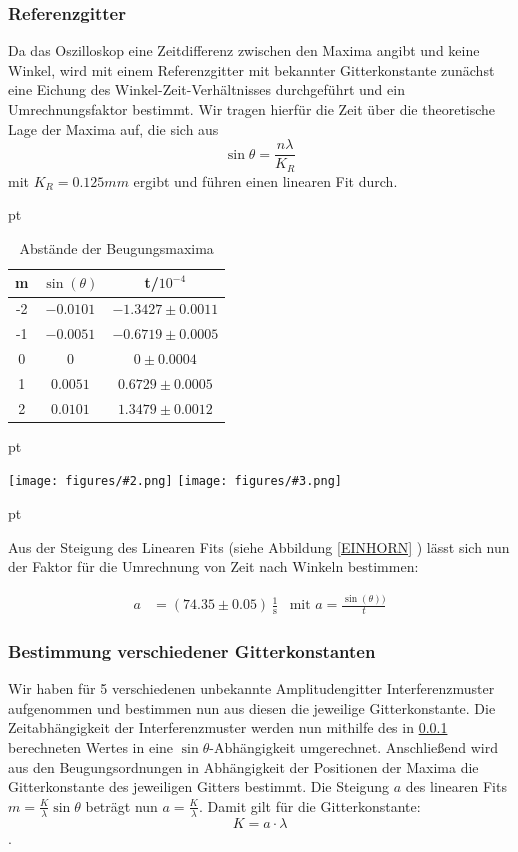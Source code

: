 \documentclass[12pt]{article}
\newcommand{\graTwo}[4][0.5]{
	\begin{minipage}[h!]{\textwidth}
		\centering
		\texttt{[image: figures/\#2.png]}
		\texttt{[image: figures/\#3.png]}
		\captionof{figure}{#4}
	\end{minipage}
	\vskip 30 pt
}
\begin{document}
\subsubsection{Referenzgitter}

\label{Happyisttoll}

Da das Oszilloskop eine Zeitdifferenz zwischen den Maxima angibt und keine Winkel, wird mit einem Referenzgitter mit bekannter Gitterkonstante zunächst eine Eichung des Winkel-Zeit-Verhältnisses durchgeführt und ein Umrechnungsfaktor bestimmt. Wir tragen hierfür die Zeit über die theoretische Lage der Maxima auf, die sich aus \[\sin\theta=\frac{n\lambda}{K_R}\] mit $K_R = 0.125 mm$ ergibt und führen einen linearen Fit durch.

 pt
 \begin{table}[h!]
 {\centering{}
\begin{tabular}{c||c|c}
 m & $\sin(\theta)$ & t/$10^{-4}$ \\ \hline\hline
 -2 &$-0.0101$&    $ -1.3427 \pm 0.0011 $  \\ \hline
 -1 &$-0.0051$& $ -0.6719 \pm 0.0005 $     \\ \hline
 0 &$0$&  $ 0\pm 0.0004$         \\ \hline
 1 &$0.0051$&   $ 0.6729 \pm 0.0005 $        \\ \hline
 2 &$0.0101$&     $ 1.3479 \pm 0.0012 $        \\ \hline

 \end{tabular}
 
 \caption{Abstände der Beugungsmaxima}}
\end{table}
 pt

\graTwo[0.49]{referenzgitter}{Zeiteichung}{Zeit-Winkel-Eichung\label{EINHORN}}

Aus der Steigung des Linearen Fits (siehe Abbildung \ref{EINHORN} ) lässt sich nun der Faktor für die Umrechnung von Zeit nach Winkeln bestimmen:

\begin{align*}
a &= (74.35\pm0.05)\,\frac1{\mathrm{s}}&
\text{mit } a = \frac{\sin(\theta))}{t}
\end{align*}

\subsubsection{Bestimmung verschiedener Gitterkonstanten}\label{amplitudengitterkonstante}
Wir haben für 5 verschiedenen unbekannte Amplitudengitter Interferenzmuster aufgenommen und bestimmen nun aus diesen die jeweilige Gitterkonstante. Die Zeitabhängigkeit der Interferenzmuster werden nun mithilfe des in \ref{Happyisttoll} berechneten Wertes in eine $\sin\theta$-Abhängigkeit umgerechnet. Anschließend wird aus den Beugungsordnungen in Abhängigkeit der Positionen der Maxima die Gitterkonstante des jeweiligen Gitters bestimmt. Die Steigung $a$ des linearen Fits $m=\frac{K}{\lambda}\sin\theta$ beträgt nun $a=\frac{K}{\lambda}$. Damit gilt für die Gitterkonstante: $$K=a\cdot\lambda$$.
\end{document}
